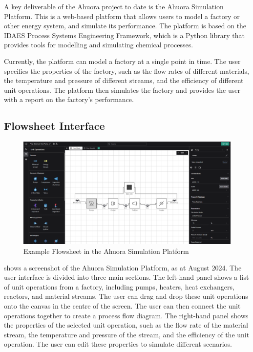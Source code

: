 A key deliverable of the Ahuora project to date is the Ahuora Simulation Platform. This is a web-based platform that allows users to model a factory or other energy system, and simulate its performance. The platform is based on the IDAES Process Systems Engineering Framework, which is a Python library that provides tools for modelling and simulating chemical processes.

Currently, the platform can model a factory at a single point in time. The user specifies the properties of the factory, such as the flow rates of different materials, the temperature and pressure of different streams, and the efficiency of different unit operations. The platform then simulates the factory and provides the user with a report on the factory's performance.

\subsection{Flowsheet Interface}


\begin{figure}
    \centering
    \includegraphics[width=\textwidth]{platform_screenshot.png}
    \caption{Example Flowsheet in the Ahuora Simulation Platform}
    \label{fig:platform}
\end{figure}

 shows a screenshot of the Ahuora Simulation Platform, as at August 2024. The user interface is divided into three main sections. The left-hand panel shows a list of unit operations from a factory, including pumps, heaters, heat exchangers, reactors, and material streams. The user can drag and drop these unit operations onto the canvas in the centre of the screen. The user can then connect the unit operations together to create a process flow diagram. The right-hand panel shows the properties of the selected unit operation, such as the flow rate of the material stream, the temperature and pressure of the stream, and the efficiency of the unit operation. The user can edit these properties to simulate different scenarios.

